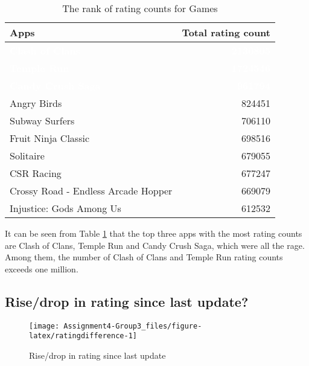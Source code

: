 \documentclass[
]{article}
\begin{document}
\begin{table}[!h]

\caption{\label{tab:ranknumcount}The rank of rating counts for Games}
\centering
\begin{tabular}[t]{l|r}
\hline
Apps & Total rating count\\
\hline
\rowcolor{gray!6}  \rowcolor{steelblue}  \textcolor{white}{\textbf{Clash of Clans}} & \textcolor{white}{\textbf{2130805}}\\
\hline
\rowcolor{steelblue}  \textcolor{white}{\textbf{Temple Run}} & \textcolor{white}{\textbf{1724546}}\\
\hline
\rowcolor{gray!6}  \rowcolor{steelblue}  \textcolor{white}{\textbf{Candy Crush Saga}} & \textcolor{white}{\textbf{961794}}\\
\hline
Angry Birds & 824451\\
\hline
\rowcolor{gray!6}  Subway Surfers & 706110\\
\hline
Fruit Ninja Classic & 698516\\
\hline
\rowcolor{gray!6}  Solitaire & 679055\\
\hline
CSR Racing & 677247\\
\hline
\rowcolor{gray!6}  Crossy Road - Endless Arcade Hopper & 669079\\
\hline
Injustice: Gods Among Us & 612532\\
\hline
\end{tabular}
\end{table}

It can be seen from Table \ref{tab:ranknumcount} that the top three apps with the most rating counts are Clash of Clans, Temple Run and Candy Crush Saga, which were all the rage. Among them, the number of Clash of Clans and Temple Run rating counts exceeds one million.

\hypertarget{risedrop-in-rating-since-last-update}{%
\subsection{Rise/drop in rating since last update?}\label{risedrop-in-rating-since-last-update}}

\begin{figure}

{\centering \texttt{[image: Assignment4-Group3\_files/figure-latex/ratingdifference-1]} 

}

\caption{Rise/drop in rating since last update}\label{fig:ratingdifference}
\end{figure}
\end{document}
